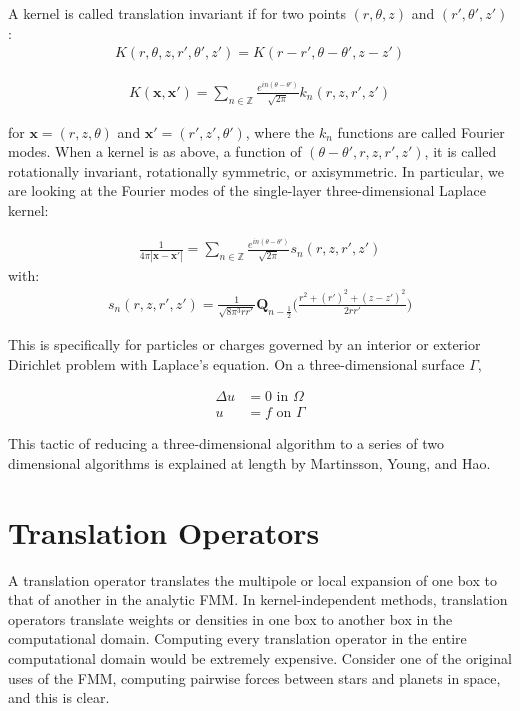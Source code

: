 \documentclass[11pt, oneside]{article}   	%
\begin{document}
A kernel is called translation invariant if for two points $(r,\theta,z)$ and $(r',\theta',z')$:
\begin{align}
K(r,\theta,z,r',\theta',z')=K(r-r',\theta-\theta',z-z')
\end{align}

\begin{align}
K(\mathbf{x},\mathbf{x'})=\sum_{n\in\mathbb{Z}} \frac{e^{in(\theta-\theta')}}{\sqrt{2\pi}}k_n(r,z,r',z')
\end{align}

for $\mathbf{x}=(r,z,\theta)$ and $\mathbf{x'}=(r',z',\theta')$, where the $k_n$ functions are called Fourier modes. When a kernel is as above, a function of $(\theta-\theta',r,z,r',z')$, it is called rotationally invariant, rotationally symmetric, or axisymmetric. In particular, we are looking at the Fourier modes of the single-layer three-dimensional Laplace kernel:

\begin{align}
\frac{1}{4\pi |\mathbf{x}-\mathbf{x'}|}=\sum_{n\in\mathbb{Z}} \frac{e^{in(\theta-\theta')}}{\sqrt{2\pi}} s_n(r,z,r',z')
\end{align}
with: 
\begin{align}
s_n(r,z,r',z')=\frac{1}{\sqrt{8\pi^3 rr'}}\mathbf{Q}_{n-\frac{1}{2}}\bigg(\frac{r^2+(r')^2+(z-z')^2}{2rr'}\bigg)
\end{align}

This is specifically for particles or charges governed by an interior or exterior Dirichlet problem with Laplace's equation. On a three-dimensional surface $\Gamma$,

\begin{align}
\Delta u &= 0 \mbox{ in }\Omega\\
u &= f \mbox{ on }\Gamma
\end{align}

This tactic of reducing a three-dimensional algorithm to a series of two dimensional algorithms is explained at length by Martinsson, Young, and Hao.

\section{Translation Operators}
A translation operator translates the multipole or local expansion of one box to that of another in the analytic FMM. In kernel-independent methods, translation operators translate weights or densities in one box to another box in the computational domain. Computing every translation operator in the entire computational domain would be extremely expensive. Consider one of the original uses of the FMM, computing pairwise forces between stars and planets in space, and this is clear.
\end{document}
